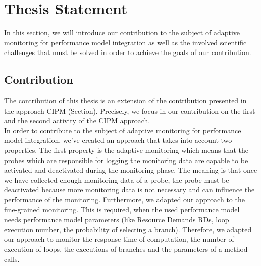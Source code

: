 
\chapter{Thesis Statement}
\label{ch:Thesis Statement}
In this section, we will introduce our contribution to the subject of adaptive monitoring for performance model integration as well as the involved scientific challenges that must be solved in order to achieve the goals of our contribution. 

\section{Contribution}
\label{sec:Contribution}
The contribution of this thesis is an extension of the contribution presented in the approach CIPM (Section). Precisely, we focus in our contribution on the first and the second activity of the CIPM approach. \\

In order to contribute to the subject of adaptive monitoring for performance model integration, we’ve created an approach that takes into account two properties. The first property is the adaptive monitoring which means that the probes which are responsible for logging the monitoring data are capable to be activated and deactivated during the monitoring phase. The meaning is that once we have collected enough monitoring data of a probe, the probe must be deactivated because more monitoring data is not necessary and can influence the performance of the monitoring.   Furthermore, we adapted our approach to the fine-grained monitoring. This is required, when the used performance model needs performance model parameters (like Resource Demands RDs, loop execution number, the probability of selecting a branch). Therefore, we adapted our approach to monitor the response time of computation, the number of execution of loops, the executions of branches and the parameters of a method calls.\\

